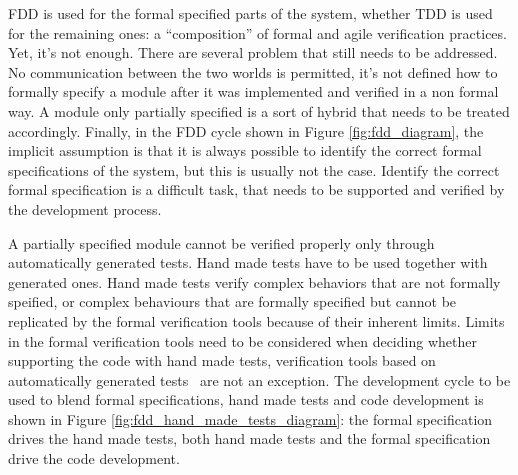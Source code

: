 \documentclass{article}
\begin{document}
FDD is used for the formal specified parts of the system, whether TDD is used for the remaining ones: a ``composition'' of formal and agile verification practices.
Yet, it's not enough.
There are several problem that still needs to be addressed.
No communication between the two worlds is permitted, it's not defined how to formally specify a module after it was implemented and verified in a non formal way.
A module only partially specified is a sort of hybrid that needs to be treated accordingly.
Finally, in the FDD cycle shown in Figure \ref{fig:fdd_diagram}, the implicit assumption is that it is always possible to identify the correct formal specifications of the system, but this is usually not the case.
Identify the correct formal specification is a difficult task, that needs to be supported and verified by the development process.

A partially specified module cannot be verified properly only through automatically generated tests.
Hand made tests have to be used together with generated ones.
Hand made tests verify complex behaviors that are not formally speified, or complex behaviours that are formally specified but cannot be replicated by the formal verification tools because of their inherent limits. 
Limits in the formal verification tools need to be considered when deciding whether supporting the code with hand made tests, verification tools based on automatically generated tests~\cite{Glass2002} are not an exception.
The development cycle to be used to blend formal specifications, hand made tests and code development is shown in Figure \ref{fig:fdd_hand_made_tests_diagram}: the formal specification drives the hand made tests, both hand made tests and the formal specification drive the code development.
\end{document}
